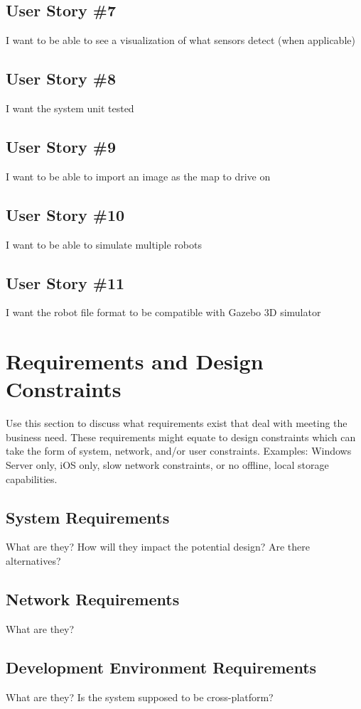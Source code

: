 \subsection{User Story \#7} 
I want to be able to see a visualization of what sensors detect (when applicable)

\subsection{User Story \#8} 
I want the system unit tested

\subsection{User Story \#9} 
I want to be able to import an image as the map to drive on

\subsection{User Story \#10} 
I want to be able to simulate multiple robots

\subsection{User Story \#11} 
I want the robot file format to be compatible with Gazebo 3D simulator

\section{Requirements and Design Constraints}
Use this section to discuss what requirements exist that deal with meeting the 
business need.  These requirements might equate to design constraints which can 
take the form of system, network, and/or user constraints.  Examples:  Windows 
Server only, iOS only, slow network constraints, or no offline, local storage capabilities. 


\subsection{System  Requirements}
What are they?  How will they impact the potential design?  Are there alternatives? 


\subsection{Network Requirements}
What are they? 


\subsection{Development Environment Requirements}
What are they?  Is the system supposed to be cross-platform? 

